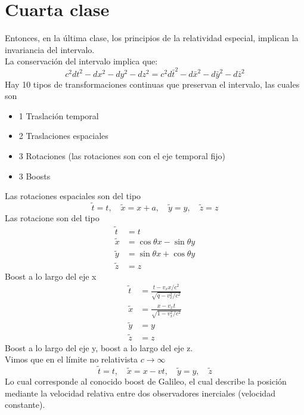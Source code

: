 \documentclass[../main.tex]{subfiles}
\begin{document}
\section{Cuarta clase}
Entonces, en la última clase, los principios de la relatividad especial, implican la invariancia del intervalo. \\
La conservación del intervalo implica que:
\begin{equation}
    c^2dt^2-dx^2-dy^2-dz^2=c^2d\bar{t}^2-d\bar{x}^2-d\bar{y}^2-d\bar{z}^2
\end{equation}
Hay 10 tipos de transformaciones continuas que preservan el intervalo, las cuales son 
\begin{itemize}
    \item  1 Traslación temporal
    \item 2 Traslaciones espaciales
    \item 3 Rotaciones (las rotaciones son con el eje temporal fijo)
    \item 3 Boosts
\end{itemize}
Las rotaciones espaciales son del tipo
\begin{equation}
    \tilde{t}=t ,\quad \tilde{x}=x+a , \quad \tilde{y}= y, \quad \tilde{z}=z
\end{equation}
Las rotacione son del tipo
\begin{align*}
    \tilde{t} & = t \\
    \tilde{x} &  = \cos{\theta}x- \sin{\theta}y \\
    \tilde{y} &  = \sin{\theta}x + \cos{\theta}y \\
    \tilde{z}  & = z
\end{align*}
Boost a lo largo del eje x 
\begin{align*}
    \tilde{t} & = \frac{t-v_xx/c^2}{\sqrt{q-v_x^2/c^2}} \\
    \tilde{x} & = \frac{x-v_xt}{\sqrt{1-v_x^2/c^2}} \\
    \tilde{y} & = y\\
    \tilde{z} & = z
\end{align*}
Boost a lo largo del eje y, boost a lo largo del eje z. \\
Vimos que en el límite no relativista $c \to \infty$
\begin{equation}
    \tilde{t} = t , \quad \tilde{x}= x-vt,\quad \tilde{y}=y , \quad \tilde{z} 
\end{equation}
Lo cual corresponde al conocido boost de Galileo, el cual describe la posición mediante la velocidad relativa entre dos observadores inerciales (velocidad constante). \\
\end{document}
